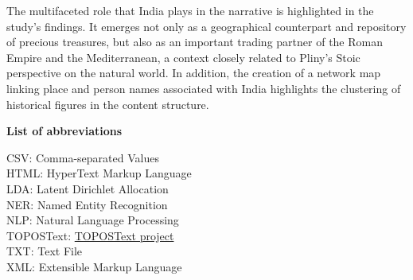 The multifaceted role that India plays in the narrative is highlighted in the study's findings. It emerges not only as a geographical counterpart and repository of precious treasures, but also as an important trading partner of the Roman Empire and the Mediterranean, a context closely related to Pliny's Stoic perspective on the natural world. In addition, the creation of a network map linking place and person names associated with India highlights the clustering of historical figures in the content structure.

\newpage


\raggedright

\Large\textbf{List of abbreviations}   

\vspace*{\baselineskip}
\normalsize
CSV: Comma-separated Values\\
HTML: HyperText Markup Language\\
LDA: Latent Dirichlet Allocation\\
NER: Named Entity Recognition\\
NLP: Natural Language Processing \\
TOPOSText: \href{https://topostext.org/}{TOPOSText project} \\
TXT: Text File\\
XML: Extensible Markup Language\\

\newpage

\normalsize
\justifying